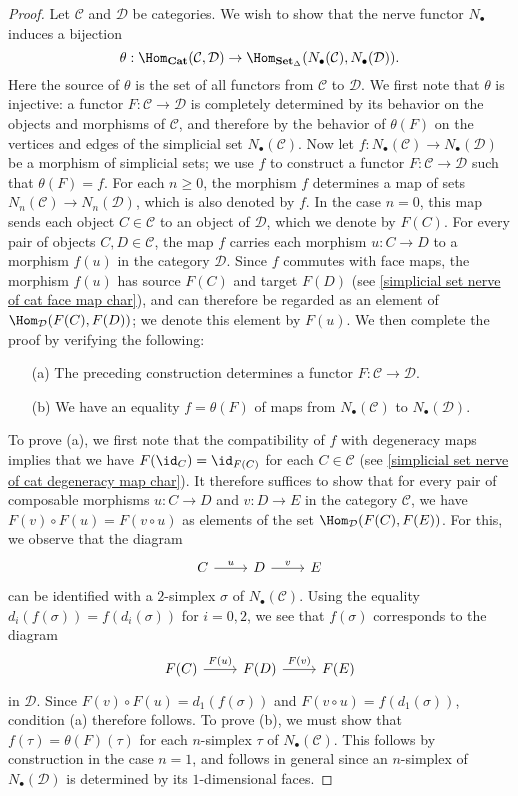 \begin{proof}
Let $\mathcal{C}$ and $\mathcal{D}$ be categories. We wish to show that the nerve functor $N_\bullet$ induces a bijection
\[\theta:\Hom_{\mathbf{Cat}}(\mathcal{C},\mathcal{D})\to\Hom_{\mathbf{Set}_\Delta}(N_\bullet(\mathcal{C}),N_\bullet(\mathcal{D})).\]
Here the source of $\theta$ is the set of all functors from $\mathcal{C}$ to $\mathcal{D}$. We first note that $\theta$ is injective: a functor $F:\mathcal{C}\to\mathcal{D}$ is completely determined by its behavior on the objects and morphisms of $\mathcal{C}$, and therefore by the behavior of $\theta(F)$ on the vertices and edges of the simplicial set $N_\bullet(\mathcal{C})$. Now let $f:N_\bullet(\mathcal{C})\to N_\bullet(\mathcal{D})$ be a morphism of simplicial sets; we use $f$ to construct a functor $F:\mathcal{C}\to\mathcal{D}$ such that $\theta(F)=f$. For each $n\geq 0$, the morphism $f$ determines a map of sets $N_n(\mathcal{C})\to N_n(\mathcal{D})$, which is also denoted by $f$. In the case $n=0$, this map sends each object $C\in\mathcal{C}$ to an object of $\mathcal{D}$, which we denote by $F(C)$. For every pair of objects $C,D\in\mathcal{C}$, the map $f$ carries each morphism $u:C\to D$ to a morphism $f(u)$ in the category $\mathcal{D}$. Since $f$ commutes with face maps, the morphism $f(u)$ has source $F(C)$ and target $F(D)$ (see \cref{simplicial set nerve of cat face map char}), and can therefore be regarded as an element of $\Hom_{\mathcal{D}}(F(C),F(D))$; we denote this element by $F(u)$. We then complete the proof by verifying the following:
\begin{itemize}
\item[(a)] The preceding construction determines a functor $F:\mathcal{C}\to\mathcal{D}$.
\item[(b)] We have an equality $f=\theta(F)$ of maps from $N_\bullet(\mathcal{C})$ to $N_\bullet(\mathcal{D})$.
\end{itemize}
To prove (a), we first note that the compatibility of $f$ with degeneracy maps implies that we have $F(\id_C)=\id_{F(C)}$ for each $C\in\mathcal{C}$ (see \cref{simplicial set nerve of cat degeneracy map char}). It therefore suffices to show that for every pair of composable morphisms $u:C\to D$ and $v:D\to E$ in the category $\mathcal{C}$, we have $F(v)\circ F(u)=F(v\circ u)$ as elements of the set $\Hom_{\mathcal{D}}(F(C),F(E))$. For this, we observe that the diagram
\[\begin{tikzcd}
C\ar[r,"u"]&D\ar[r,"v"]&E
\end{tikzcd}\]
can be identified with a $2$-simplex $\sigma$ of $N_\bullet(\mathcal{C})$. Using the equality $d_i(f(\sigma))=f(d_i(\sigma))$ for $i=0,2$, we see that $f(\sigma)$ corresponds to the diagram
\[\begin{tikzcd}
F(C)\ar[r,"F(u)"]&F(D)\ar[r,"F(v)"]&F(E)
\end{tikzcd}\]
in $\mathcal{D}$. Since $F(v)\circ F(u)=d_1(f(\sigma))$ and $F(v\circ u)=f(d_1(\sigma))$, condition (a) therefore follows. To prove (b), we must show that $f(\tau)=\theta(F)(\tau)$ for each $n$-simplex $\tau$ of $N_\bullet(\mathcal{C})$. This follows by construction in the case $n=1$, and follows in general since an $n$-simplex of $N_\bullet(\mathcal{D})$ is determined by its $1$-dimensional faces.
\end{proof}
